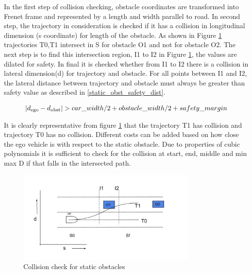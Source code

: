 
In the first step of collision checking, obstacle coordinates are transformed into Frenet frame and represented by a length and width parallel to road. In second step, the trajectory in consideration is checked if it has a collision in longitudinal dimension (s coordinate) for length of the obstacle. As shown in Figure \ref{static_check} trajectories T0,T1 intersect in S for obstacle O1 and not for obstacle O2. The next step is to find this intersection region, I1 to I2 in Figure \ref{static_check}, the values are dilated for safety. In final it is checked whether from I1 to I2 there is a collision in lateral dimension(d) for trajectory and obstacle. For all points between I1 and I2, the lateral distance between trajectory and obstacle must always be greater than safety value as described in \ref{static_obst_safety_dist}. 

\begin{equation}
    |d\textsubscript{ego} - d\textsubscript{obst}| > car\_width/2 + obstacle\_width/2 + safety\_margin
    \label{static_obst_safety_dist}
\end{equation}

It is clearly representative from figure \ref{static_check} that the trajectory T1 has collision and trajectory T0 has no collision. Different costs can be added based on how close the ego vehicle is with respect to the static obstacle. Due to properties of cubic polynomials it is sufficient to check for the collision at start, end, middle and min max D if that falls in the intersected path. 


 \begin{figure}
    \centering
    \includegraphics[width=0.8\textwidth]{Images/static_check.png}
    \caption{Collision check for static obstacles}
    \label{static_check}
\end{figure}



